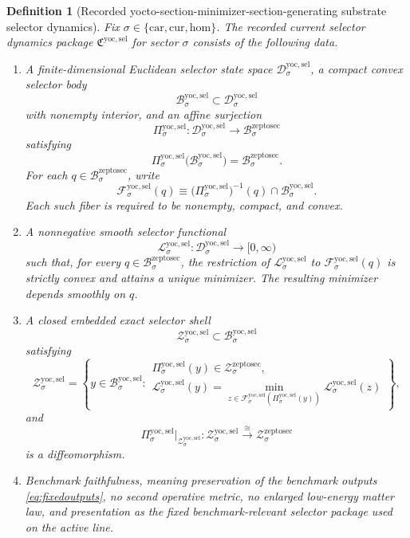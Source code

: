 \documentclass[11pt]{article}
\newcommand{\Car}{\mathrm{car}}
\newcommand{\Cur}{\mathrm{cur}}
\newcommand{\Hom}{\mathrm{hom}}
\newcommand{\ZeptoSectionBody}[1]{\mathcal B_{#1}^{\mathrm{zeptosec}}}
\newcommand{\ZeptoSectionShell}[1]{\mathcal Z_{#1}^{\mathrm{zeptosec}}}
\newcommand{\YoctoSelectorPackage}{\mathfrak C^{\mathrm{yoc,sel}}}
\newcommand{\YoctoSelectorSpace}[1]{\mathcal D_{#1}^{\mathrm{yoc,sel}}}
\newcommand{\YoctoSelectorBody}[1]{\mathcal B_{#1}^{\mathrm{yoc,sel}}}
\newcommand{\YoctoSelectorProj}[1]{\Pi_{#1}^{\mathrm{yoc,sel}}}
\newcommand{\YoctoSelectorFiber}[2]{\mathcal F_{#1}^{\mathrm{yoc,sel}}(#2)}
\newcommand{\YoctoSelectorFunctional}[1]{\mathscr L_{#1}^{\mathrm{yoc,sel}}}
\newcommand{\YoctoSelectorShell}[1]{\mathcal Z_{#1}^{\mathrm{yoc,sel}}}
\newtheorem{definition}{Definition}
\begin{document}
\begin{definition}[Recorded yocto-section-minimizer-section-generating substrate selector dynamics]
\label{def:selector}
Fix \(\sigma\in\{\Car,\Cur,\Hom\}\). The recorded current selector dynamics package \(\YoctoSelectorPackage\) for sector \(\sigma\) consists of the following data.
\begin{enumerate}
    \item A finite-dimensional Euclidean selector state space \(\YoctoSelectorSpace{\sigma}\), a compact convex selector body
    \[
    \YoctoSelectorBody{\sigma}\subset\YoctoSelectorSpace{\sigma}
    \]
    with nonempty interior, and an affine surjection
    \[
    \YoctoSelectorProj{\sigma}:\YoctoSelectorSpace{\sigma}\to\ZeptoSectionBody{\sigma}
    \]
    satisfying
    \[
    \YoctoSelectorProj{\sigma}\bigl(\YoctoSelectorBody{\sigma}\bigr)=\ZeptoSectionBody{\sigma}.
    \]
    For each \(q\in\ZeptoSectionBody{\sigma}\), write
    \[
    \YoctoSelectorFiber{\sigma}{q}
    \equiv
    \bigl(\YoctoSelectorProj{\sigma}\bigr)^{-1}(q)\cap\YoctoSelectorBody{\sigma}.
    \]
    Each such fiber is required to be nonempty, compact, and convex.
    \item A nonnegative smooth selector functional
    \[
    \YoctoSelectorFunctional{\sigma}:\YoctoSelectorSpace{\sigma}\to[0,\infty)
    \]
    such that, for every \(q\in\ZeptoSectionBody{\sigma}\), the restriction of \(\YoctoSelectorFunctional{\sigma}\) to \(\YoctoSelectorFiber{\sigma}{q}\) is strictly convex and attains a unique minimizer. The resulting minimizer depends smoothly on \(q\).
    \item A closed embedded exact selector shell
    \[
    \YoctoSelectorShell{\sigma}\subset\YoctoSelectorBody{\sigma}
    \]
    satisfying
    \[
    \YoctoSelectorShell{\sigma}
    =
    \left\{
    y\in\YoctoSelectorBody{\sigma}:
    \begin{array}{l}
    \YoctoSelectorProj{\sigma}(y)\in\ZeptoSectionShell{\sigma},\\[0.2em]
    \YoctoSelectorFunctional{\sigma}(y)
    =
    \displaystyle\min_{z\in\YoctoSelectorFiber{\sigma}{\YoctoSelectorProj{\sigma}(y)}}
    \YoctoSelectorFunctional{\sigma}(z)
    \end{array}
    \right\},
    \]
    and
    \[
    \YoctoSelectorProj{\sigma}\big|_{\YoctoSelectorShell{\sigma}}
    :
    \YoctoSelectorShell{\sigma}\xrightarrow{\cong}\ZeptoSectionShell{\sigma}
    \]
    is a diffeomorphism.
    \item Benchmark faithfulness, meaning preservation of the benchmark outputs \eqref{eq:fixedoutputs}, no second operative metric, no enlarged low-energy matter law, and presentation as the fixed benchmark-relevant selector package used on the active line.
\end{enumerate}
\end{definition}
\end{document}
